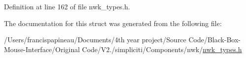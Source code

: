 \-Definition at line 162 of file nwk\-\_\-types.\-h.



\-The documentation for this struct was generated from the following file\-:\begin{DoxyCompactItemize}
\item 
/\-Users/francispapineau/\-Documents/4th year project/\-Source Code/\-Black-\/\-Box-\/\-Mouse-\/\-Interface/\-Original Code/\-V2./simpliciti/\-Components/nwk/\hyperlink{nwk__types_8h}{nwk\-\_\-types.\-h}\end{DoxyCompactItemize}
